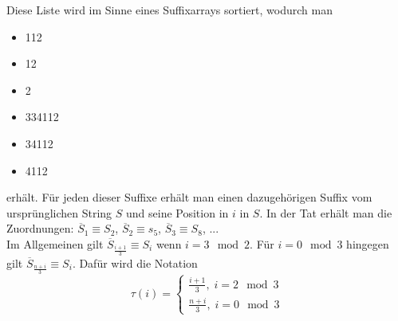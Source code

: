 \documentclass[a4paper, 12pt]{article}
\theoremstyle{plain}
\theoremstyle{definition}
\theoremstyle{lemma}
\theoremstyle{remark}
\theoremstyle{corollary}
\theoremstyle{example}
\begin{document}
	Diese Liste wird im Sinne eines Suffixarrays sortiert, wodurch man \begin{itemize}
		\item 112
		\item 12
		\item 2
		\item 334112
		\item 34112
		\item 4112
	\end{itemize} 
	erhält. Für jeden dieser Suffixe erhält man einen dazugehörigen Suffix vom ursprünglichen String $S$ und seine Position in $i$ in $S$. In der Tat erhält man die Zuordnungen: $\overline{S}_1 \equiv S_2$, $\overline{S}_2 \equiv s_5$, $\overline{S}_3 \equiv S_8$, ... \\
	Im Allgemeinen gilt $\overline{S}_{\frac{i+1}{3}} \equiv S_i$ wenn $i = 3 \mod 2$. Für $i = 0 \mod 3$ hingegen gilt $\overline{S}_{\frac{n+i}{3}} \equiv S_i$. Dafür wird die Notation \[\tau(i) = \begin{cases}
		\frac{i+1}{3}, \; i = 2 \mod 3\\
		\frac{n+i}{3}, \; i = 0 \mod 3
	\end{cases}\]
	
\end{document}
